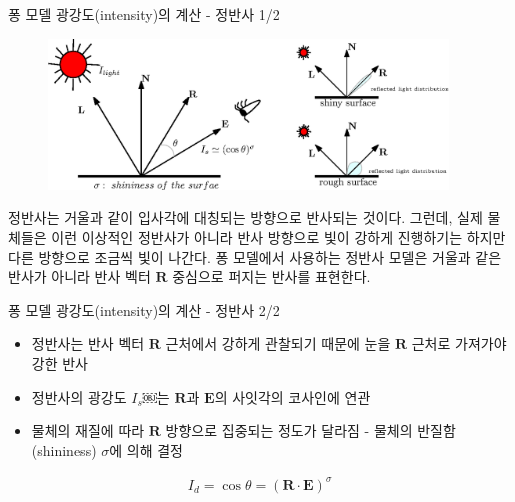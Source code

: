 \documentclass{beamer}
\begin{document}
\begin{frame}[fragile]{퐁 모델 광강도(intensity)의 계산 - 정반사 1/2}

\begin{figure}[h!]
  \centering
    \includegraphics[height=4cm]{OGL_light/specularConcept.eps}
\end{figure}

정반사는 거울과 같이 입사각에 대칭되는 방향으로 반사되는 것이다. 그런데, 실제 물체들은 이런 이상적인 정반사가 아니라 반사 방향으로 빛이 강하게 진행하기는 하지만 다른 방향으로 조금씩 빛이 나간다. 퐁 모델에서 사용하는 정반사 모델은 거울과 같은 반사가 아니라 반사 벡터 $\mathbf R$ 중심으로 퍼지는 반사를 표현한다.

\end{frame}

\begin{frame}[fragile]{퐁 모델 광강도(intensity)의 계산 - 정반사 2/2}

\begin{itemize}
\item 정반사는 반사 벡터 $\mathbf R$ 근처에서 강하게 관찰되기 때문에 눈을  $\mathbf R$ 근처로 가져가야 강한 반사
\item 정반사의 광강도 $I_s$￼는 $\mathbf R$과 $\mathbf E$의 사잇각의 코사인에 연관
\item 물체의 재질에 따라 $\mathbf R$ 방향으로 집중되는 정도가 달라짐 - 물체의 반질함(shininess) $\sigma$에 의해 결정
\end{itemize}

\begin{eqnarray}
\label{eq:specularIntensity}
I_d  = \cos \theta =  (\mathbf R \cdot \mathbf E )^\sigma \nonumber
\end{eqnarray}

\end{frame}
\end{document}
